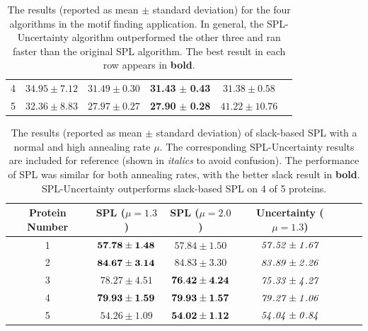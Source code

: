 \documentclass{article}
\begin{document}
\begin{table}[h]
\begin{center}
{\begin{tabular}{|c|c|c|c|c|c|}
4 & $34.95 \pm 7.12$ & $31.49 \pm 0.30$ & \textbf{31.43} $\pm$ \textbf{0.43} & $31.38 \pm 0.58$\\
5 & $32.36 \pm 8.83$ & $27.97 \pm 0.27$ & \textbf{27.90} $\pm$ \textbf{0.28} & $41.22 \pm 10.76$\\\hline
\end{tabular}
}
\end{center}
\caption{The results (reported as mean $\pm$ standard deviation) for the four algorithms in the motif finding application. In general, the SPL-Uncertainty algorithm outperformed the other three and ran faster than the original SPL algorithm.  The best result in each row appears in \textbf{bold}. }
\label{tbl:motif}
\end{table}



\begin{table}[h]
\caption{The results (reported as mean $\pm$ standard deviation) of slack-based SPL with a normal and high annealing rate $\mu$. The corresponding SPL-Uncertainty results are included for reference (shown in \emph{italics} to avoid confusion). The performance of SPL was similar for both annealing rates, with the better slack result in \textbf{bold}.  SPL-Uncertainty outperforms slack-based SPL on 4 of 5 proteins.}
\begin{center}
\begin{tabular}{|c|c|c|c|c|c|}
\hline Protein Number  & SPL ($\mu=1.3$) & SPL ($\mu=2.0$) & Uncertainty ($\mu=1.3$) \\\hline
1 & ${\bf57.78 \pm 1.48}$ & $57.84 \pm 1.50$ & $\it{57.52 \pm 1.67}$ \\ \hline
2 & ${\bf84.67 \pm 3.14}$ & $84.83 \pm 3.30$ & $\it{83.89 \pm 2.26}$ \\ \hline
3 & $78.27 \pm 4.51$ & ${\bf76.42 \pm 4.24}$ & $\it{75.33 \pm 4.27}$ \\ \hline
4 & ${\bf79.93 \pm 1.59}$ & ${\bf79.93 \pm 1.57}$ & $\it{79.27 \pm 1.06}$ \\ \hline
5 & $54.26 \pm 1.09$ & ${\bf54.02 \pm 1.12}$ & $\it{54.04 \pm 0.84}$ \\ \hline
\end{tabular}
\end{center}
\label{tbl:faster}
\end{table}
\end{document}
